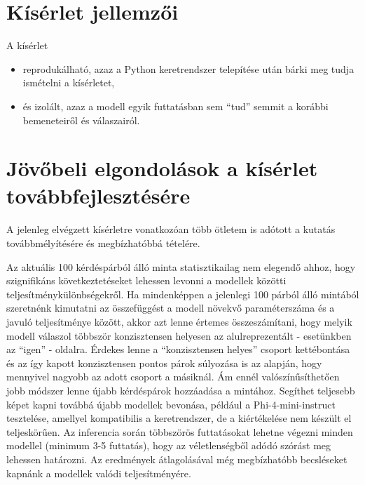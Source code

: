 \documentclass[12pt]{report}
\begin{document}
    \section{Kísérlet jellemzői}

A kísérlet
\begin{itemize}
        \item reprodukálható, azaz a Python keretrendszer telepítése után bárki meg tudja ismételni a kísérletet,
        \item és izolált, azaz a modell egyik futtatásban sem ``tud'' semmit a korábbi bemeneteiről és válaszairól.
    \end{itemize}

    \section{Jövőbeli elgondolások a kísérlet továbbfejlesztésére}
    A jelenleg elvégzett kísérletre vonatkozóan több ötletem is adótott a kutatás továbbmélyítésére és megbízhatóbbá tételére.

    Az aktuális 100 kérdéspárból álló minta statisztikailag nem elegendő ahhoz, hogy szignifikáns következtetéseket lehessen levonni a modellek közötti teljesítménykülönbségekről.
    Ha mindenképpen a jelenlegi 100 párból álló mintából szeretnénk kimutatni az összefüggést a modell növekvő paraméterszáma és a javuló teljesítménye között, akkor azt lenne értemes összeszámítani, hogy melyik modell válaszol többször konzisztensen helyesen az alulreprezentált - esetünkben az ``igen'' - oldalra. 
    Érdekes lenne a ``konzisztensen helyes'' csoport kettébontása és az így kapott konzisztensen pontos párok súlyozása is az alapján, hogy mennyivel nagyobb az adott csoport a másiknál. 
    Ám ennél valószínűsíthetően jobb módszer lenne újabb kérdéspárok hozzáadása a mintához. Segíthet teljesebb képet kapni továbbá újabb modellek bevonása, például a Phi-4-mini-instruct tesztelése, amellyel kompatibilis a keretrendszer, de a kiértékelése nem készült el teljeskörűen.
    Az inferencia során többszörös futtatásokat lehetne végezni minden modellel (minimum 3-5 futtatás), hogy az véletlenségből adódó szórást meg lehessen határozni. Az eredmények átlagolásával még megbízhatóbb becsléseket kapnánk a modellek valódi teljesítményére.
\end{document}
